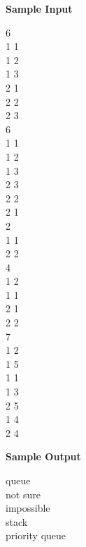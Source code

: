 \begin{flushleft}
{\color{red} \textbf{Sample Input}}
\end{flushleft}
\begin{flushleft}
6\\
1 1\\
1 2\\
1 3\\
2 1\\
2 2\\
2 3\\
6\\
1 1\\
1 2\\
1 3\\
2 3\\
2 2\\
2 1\\
2\\
1 1\\
2 2\\
4\\
1 2\\
1 1\\
2 1\\
2 2\\
7\\
1 2\\
1 5\\
1 1\\
1 3\\
2 5\\
1 4\\
2 4\\
\end{flushleft}

\begin{flushleft}
{\color{red} \textbf{Sample Output}}
\end{flushleft}
\begin{flushleft}
queue\\
not sure\\
impossible\\
stack\\
priority queue\\
\end{flushleft}

\newpage